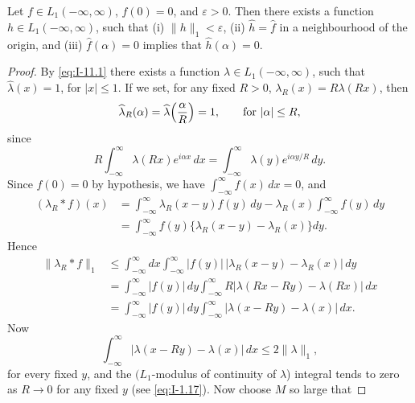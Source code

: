 \begin{theorem}\label{thm:I-19}
Let $f\in L_1(-\infty,\infty)$, $f(0)=0$, and $\varepsilon>0$. Then there exists a function $h\in L_1(-\infty,\infty)$, such that (i) $\|h\|_1<\varepsilon$, (ii) $\widehat h=\widehat f$ in a neighbourhood of the origin, and (iii) $\widehat f(\alpha)=0$ implies that $\widehat h(\alpha)=0$.
\end{theorem}

\begin{proof}
By \eqref{eq:I-11.1} there exists a function $\lambda\in L_1(-\infty,\infty)$, such that $\widehat\lambda(x)=1$, for $|x|\le 1$. If we set, for any fixed $R>0$, $\lambda_R(x)=R\lambda(Rx)$, then
\begin{equation*}
\widehat\lambda_R(\alpha)=\widehat\lambda\Bigl(\frac{\alpha}{R}\Bigr)=1,\qquad\text{for }|\alpha|\le R,
\end{equation*}
since
\begin{equation*}
R\int_{-\infty}^{\infty}\lambda(Rx)e^{i\alpha x}\,dx=\int_{-\infty}^{\infty}\lambda(y)e^{i\alpha y/R}\,dy.
\end{equation*}
Since $\widehat f(0)=0$ by hypothesis, we have $\int_{-\infty}^{\infty}f(x)\,dx=0$, and
\begin{equation*}
\begin{aligned}
(\lambda_R*f)(x) &= \int_{-\infty}^{\infty}\lambda_R(x-y)f(y)\,dy-\lambda_R(x)\int_{-\infty}^{\infty}f(y)\,dy\\
&= \int_{-\infty}^{\infty}f(y)\bigl\{\lambda_R(x-y)-\lambda_R(x)\bigr\}dy.
\end{aligned}
\end{equation*}
Hence
\begin{equation*}
\begin{aligned}
\|\lambda_R*f\|_1
&\le\int_{-\infty}^{\infty}dx\int_{-\infty}^{\infty}|f(y)|\,|\lambda_R(x-y)-\lambda_R(x)|\,dy\\
&= \int_{-\infty}^{\infty}|f(y)|\,dy\int_{-\infty}^{\infty}R|\lambda(Rx-Ry)-\lambda(Rx)|\,dx\\
&= \int_{-\infty}^{\infty}|f(y)|\,dy\int_{-\infty}^{\infty}|\lambda(x-Ry)-\lambda(x)|\,dx.
\end{aligned}
\end{equation*}
Now
\begin{equation*}
\int_{-\infty}^{\infty}|\lambda(x-Ry)-\lambda(x)|\,dx\le 2\|\lambda\|_1,
\end{equation*}
for every fixed $y$, and the $(L_1$-modulus of continuity of $\lambda$) integral tends to zero as $R\to 0$ for any fixed $y$ (see \eqref{eq:I-1.17}). Now choose $M$ so large that

\end{proof}
